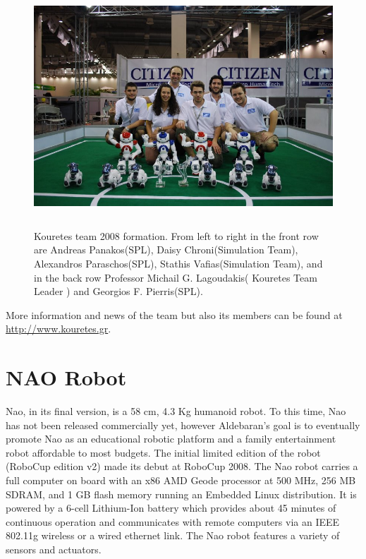 \begin{figure}[h]
	\begin{center}
		\includegraphics[height = 9cm]{Chapter1/figures/kouretesTeam2008formation.jpg}
		\caption{\small{Kouretes team 2008 formation. From left to right in the front row are Andreas Panakos(SPL), Daisy Chroni(Simulation Team), Alexandros Paraschos(SPL), Stathis Vafias(Simulation Team), and in the back row Professor Michail G. Lagoudakis( Kouretes Team Leader ) and Georgios F. Pierris(SPL).}}
 		\label{fig:kouretes2008formation}
	\end{center}
\end{figure}

More information and news of the team but also its members can be found at \url{http://www.kouretes.gr}.

\section{NAO Robot}

Nao, in its final version, is a 58 cm, 4.3 Kg humanoid robot. To this time, Nao has not been released commercially yet, however Aldebaran's goal is to eventually promote Nao as an educational robotic platform and a family entertainment robot affordable to most budgets. The initial limited edition of the robot (RoboCup edition v2) made its debut at RoboCup 2008. The Nao robot carries a full computer on board with an x86 AMD Geode processor at 500 MHz, 256 MB SDRAM, and 1 GB flash memory running an Embedded Linux distribution. It is powered by a 6-cell Lithium-Ion battery which provides about 45 minutes of continuous operation and communicates with remote computers via an IEEE 802.11g wireless or a wired ethernet link. The Nao robot features a variety of sensors and actuators.

